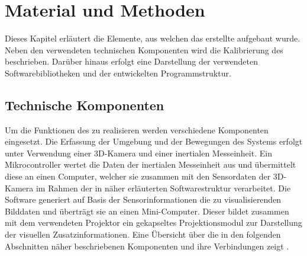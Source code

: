 \chapter{Material und Methoden}
\label{chap.material}
Dieses Kapitel erläutert die Elemente, aus welchen das erstellte \kps{} aufgebaut wurde. Neben den verwendeten technischen Komponenten wird die Kalibrierung des  beschrieben. Darüber hinaus erfolgt eine Darstellung der verwendeten Softwarebibliotheken und der entwickelten Programmstruktur.

\section{Technische Komponenten}
Um die Funktionen des  zu realisieren werden verschiedene Komponenten eingesetzt. Die Erfassung der Umgebung und der Bewegungen des Systems erfolgt unter Verwendung einer 3D-Kamera und einer inertialen Messeinheit. Ein Mikrocontroller wertet die Daten der inertialen Messeinheit aus und übermittelt diese an einen Computer, welcher sie zusammen mit den Sensordaten der 3D-Kamera im Rahmen der in  näher erläuterten Softwarestruktur verarbeitet. Die Software generiert auf Basis der Sensorinformationen die zu visualisierenden Bilddaten und überträgt sie an einen Mini-Computer. Dieser bildet zusammen mit dem verwendeten Projektor ein gekapseltes Projektionsmodul zur Darstellung der visuellen Zusatzinformationen. Eine Übersicht über die in den folgenden Abschnitten näher beschriebenen Komponenten und ihre Verbindungen zeigt .

